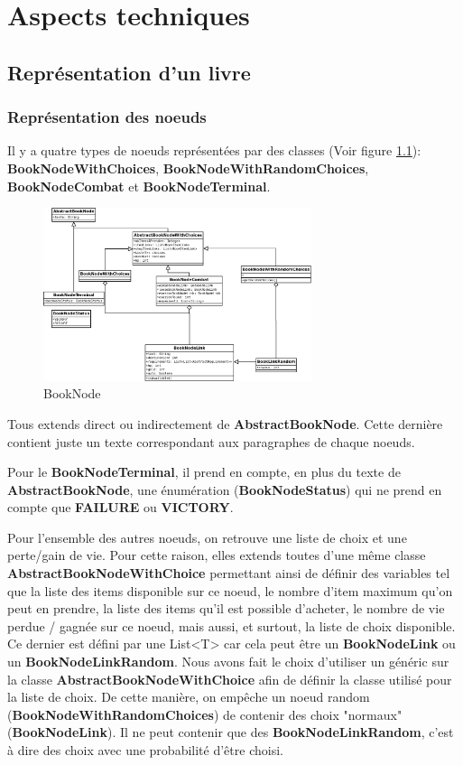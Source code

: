 \chapter{Aspects techniques}

	\section{Représentation d'un livre}

		\subsection{Représentation des noeuds}
			Il y a quatre types de noeuds représentées par des classes (Voir figure \ref{fig:BookNode}): \textbf{BookNodeWithChoices}, \textbf{BookNodeWithRandomChoices}, \textbf{BookNodeCombat} et \textbf{BookNodeTerminal}.

			\begin{figure}[H]
				\centering\includegraphics[width=0.70\textwidth]{img/BookNode.png}
				\caption{BookNode}
				\label{fig:BookNode}
			\end{figure}

			Tous extends direct ou indirectement de \textbf{AbstractBookNode}. Cette dernière contient juste un texte correspondant aux paragraphes de chaque noeuds.

			Pour le \textbf{BookNodeTerminal}, il prend en compte, en plus du texte de \textbf{AbstractBookNode}, une énumération (\textbf{BookNodeStatus}) qui ne prend en compte que \textbf{FAILURE} ou \textbf{VICTORY}.

			Pour l'ensemble des autres noeuds, on retrouve une liste de choix et une perte/gain de vie. Pour cette raison, elles extends toutes d'une même classe \textbf{AbstractBookNodeWithChoice} permettant ainsi de définir des variables tel que la liste des items disponible sur ce noeud, le nombre d'item maximum qu'on peut en prendre, la liste des items qu'il est possible d'acheter, le nombre de vie perdue / gagnée sur ce noeud, mais aussi, et surtout, la liste de choix disponible. Ce dernier est défini par une List<T> car cela peut être un \textbf{BookNodeLink} ou un \textbf{BookNodeLinkRandom}. Nous avons fait le choix d'utiliser un généric sur la classe \textbf{AbstractBookNodeWithChoice} afin de définir la classe utilisé pour la liste de choix. De cette manière, on empêche un noeud random (\textbf{BookNodeWithRandomChoices}) de contenir des choix "normaux" (\textbf{BookNodeLink}). Il ne peut contenir que des \textbf{BookNodeLinkRandom}, c'est à dire des choix avec une probabilité d'être choisi.

